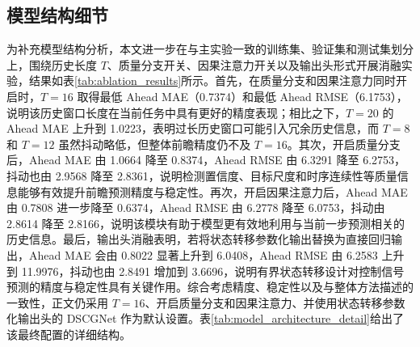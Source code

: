 \documentclass[journal]{IEEEtran}
\begin{document}
\subsection{模型结构细节}
为补充模型结构分析，本文进一步在与主实验一致的训练集、验证集和测试集划分上，围绕历史长度 $T$、质量分支开关、因果注意力开关以及输出头形式开展消融实验，结果如表\ref{tab:ablation_results}所示。首先，在质量分支和因果注意力同时开启时，$T=16$ 取得最低 Ahead MAE（0.7374）和最低 Ahead RMSE（6.1753），说明该历史窗口长度在当前任务中具有更好的精度表现；相比之下，$T=20$ 的 Ahead MAE 上升到 1.0223，表明过长历史窗口可能引入冗余历史信息，而 $T=8$ 和 $T=12$ 虽然抖动略低，但整体前瞻精度仍不及 $T=16$。其次，开启质量分支后，Ahead MAE 由 1.0664 降至 0.8374，Ahead RMSE 由 6.3291 降至 6.2753，抖动也由 2.9568 降至 2.8361，说明检测置信度、目标尺度和时序连续性等质量信息能够有效提升前瞻预测精度与稳定性。再次，开启因果注意力后，Ahead MAE 由 0.7808 进一步降至 0.6374，Ahead RMSE 由 6.2778 降至 6.0753，抖动由 2.8614 降至 2.8166，说明该模块有助于模型更有效地利用与当前一步预测相关的历史信息。最后，输出头消融表明，若将状态转移参数化输出替换为直接回归输出，Ahead MAE 会由 0.8022 显著上升到 6.0408，Ahead RMSE 由 6.2583 上升到 11.9976，抖动也由 2.8491 增加到 3.6696，说明有界状态转移设计对控制信号预测的精度与稳定性具有关键作用。综合考虑精度、稳定性以及与整体方法描述的一致性，正文仍采用 $T=16$、开启质量分支和因果注意力、并使用状态转移参数化输出头的 DSCGNet 作为默认设置。表\ref{tab:model_architecture_detail}给出了该最终配置的详细结构。

\begin{table}[H]
\centering
\caption{历史长度、质量分支、因果注意力与输出头消融结果（测试集）}
\label{tab:ablation_results}
{
\small
\setlength{\tabcolsep}{3pt}
}
\end{table}
\end{document}
